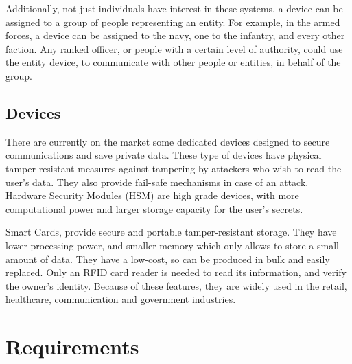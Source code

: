 Additionally, not just individuals have interest in these systems, a device can be assigned to a group of people representing an entity. For example, in the armed forces, a device can be assigned to the navy, one to the infantry, and every other faction. Any ranked officer, or people with a certain level of authority, could use the entity device, to communicate with other people or entities, in behalf of the group.

\subsection{Devices} \label{chap:problem:devices}
There are currently on the market some dedicated devices designed to secure communications and save private data.
These type of devices have physical tamper-resistant measures against tampering by attackers who wish to read the user's data. They also provide fail-safe mechanisms in case of an attack.
Hardware Security Modules (HSM) are high grade devices, with more computational power and larger storage capacity for the user's secrets.

Smart Cards, provide secure and portable tamper-resistant storage.
They have lower processing power, and smaller memory which only allows to store a small amount of data.
They have a low-cost, so can be produced in bulk and easily replaced. Only an RFID card reader is needed to read its information, and verify the owner's identity.
Because of these features, they are widely used in the retail, healthcare, communication and government industries.


\section{Requirements} \label{chap:problem:requirements}

